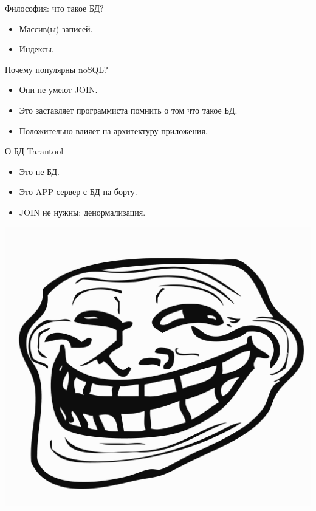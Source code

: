 \documentclass[aspectratio=169]{beamer}
\begin{document}
\begin{frame}{Философия: что такое БД?}
    \begin{itemize}
        \item Массив(ы) записей.
        \item Индексы.
    \end{itemize}
\end{frame}

\begin{frame}{Почему популярны noSQL?}
    \begin{itemize}
        \pause\item Они не умеют JOIN.
        \pause\item Это заставляет программиста помнить о том что такое БД.
        \pause\item Положительно влияет на архитектуру приложения.
    \end{itemize}
\end{frame}

\begin{frame}{О БД Tarantool}
    \begin{itemize}
        \pause\item Это не БД.
        \pause\item Это APP-сервер с БД на борту.
        \pause\item JOIN не нужны: денормализация.
    \end{itemize}
    \begin{center}
        \includegraphics[scale=0.2]{img/Trollface_HD.png}
    \end{center}
\end{frame}
\end{document}

